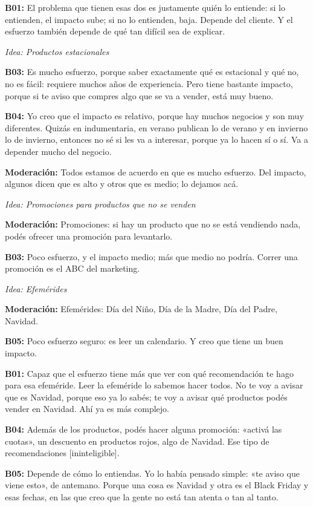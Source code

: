 \noindent\textbf{B01:} El problema que tienen esas dos es justamente quién lo entiende: si lo entienden, el impacto sube; si no lo entienden, baja. Depende del cliente. Y el esfuerzo también depende de qué tan difícil sea de explicar.

\medskip\noindent\textit{Idea: Productos estacionales}

\noindent\textbf{B03:} Es mucho esfuerzo, porque saber exactamente qué es estacional y qué no, no es fácil: requiere muchos años de experiencia. Pero tiene bastante impacto, porque si te aviso que compres algo que se va a vender, está muy bueno.

\noindent\textbf{B04:} Yo creo que el impacto es relativo, porque hay muchos negocios y son muy diferentes. Quizás en indumentaria, en verano publican lo de verano y en invierno lo de invierno, entonces no sé si les va a interesar, porque ya lo hacen sí o sí. Va a depender mucho del negocio.

\noindent\textbf{Moderación:} Todos estamos de acuerdo en que es mucho esfuerzo. Del impacto, algunos dicen que es alto y otros que es medio; lo dejamos acá.

\medskip\noindent\textit{Idea: Promociones para productos que no se venden}

\noindent\textbf{Moderación:} Promociones: si hay un producto que no se está vendiendo nada, podés ofrecer una promoción para levantarlo.

\noindent\textbf{B03:} Poco esfuerzo, y el impacto medio; más que medio no podría. Correr una promoción es el ABC del marketing.

\medskip\noindent\textit{Idea: Efemérides}

\noindent\textbf{Moderación:} Efemérides: Día del Niño, Día de la Madre, Día del Padre, Navidad.

\noindent\textbf{B05:} Poco esfuerzo seguro: es leer un calendario. Y creo que tiene un buen impacto.

\noindent\textbf{B01:} Capaz que el esfuerzo tiene más que ver con qué recomendación te hago para esa efeméride. Leer la efeméride lo sabemos hacer todos. No te voy a avisar que es Navidad, porque eso ya lo sabés; te voy a avisar qué productos podés vender en Navidad. Ahí ya es más complejo.

\noindent\textbf{B04:} Además de los productos, podés hacer alguna promoción: «activá las cuotas», un descuento en productos rojos, algo de Navidad. Ese tipo de recomendaciones [ininteligible].

\noindent\textbf{B05:} Depende de cómo lo entiendas. Yo lo había pensado simple: «te aviso que viene esto», de antemano. Porque una cosa es Navidad y otra es el Black Friday y esas fechas, en las que creo que la gente no está tan atenta o tan al tanto.

